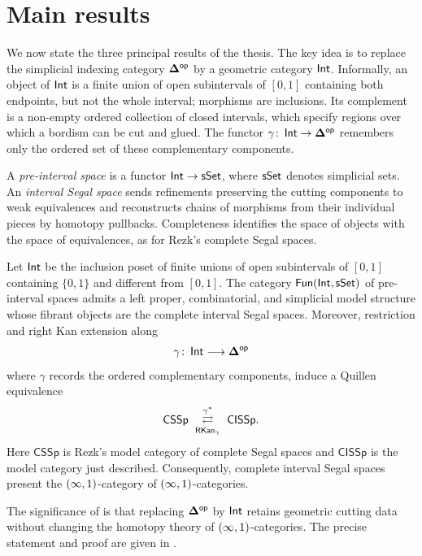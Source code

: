\section*{Main results}

We now state the three principal results of the thesis. The key idea is to
replace the simplicial indexing category $\mathbf\Delta^{\mathsf{op}}$ by a geometric
category $\operatorname{\mathsf{Int}}$. Informally, an object of $\operatorname{\mathsf{Int}}$ is a finite union of open
subintervals of $[0,1]$ containing both endpoints, but not the whole interval;
morphisms are inclusions. Its complement is a non-empty ordered collection
of closed intervals, which specify regions over which a bordism can be cut
and glued. The functor $\gamma\colon\operatorname{\mathsf{Int}}\to\mathbf\Delta^{\mathsf{op}}$ remembers only
the ordered set of these complementary components.

A \emph{pre-interval space} is a functor $\operatorname{\mathsf{Int}}\to\operatorname{\sf sSet}$, where $\operatorname{\sf sSet}$
denotes simplicial sets. An \emph{interval Segal space} sends refinements
preserving the cutting components to weak equivalences and reconstructs
chains of morphisms from their individual pieces by homotopy pullbacks.
Completeness identifies the space of objects with the space of equivalences,
as for Rezk's complete Segal spaces.

\begin{samepage}
\begin{maintheorem}
\label{intro:: thm: interval models}
Let $\operatorname{\mathsf{Int}}$ be the inclusion poset of finite unions of open subintervals of
$[0,1]$ containing $\{0,1\}$ and different from $[0,1]$. The category
$\operatorname{\sf Fun}(\operatorname{\mathsf{Int}},\operatorname{\sf sSet})$ of pre-interval spaces admits a left proper, combinatorial, and
simplicial model structure whose fibrant objects are the complete interval
Segal spaces. Moreover, restriction and right Kan extension along
\[
    \gamma\colon \operatorname{\mathsf{Int}}\longrightarrow\mathbf\Delta^{\mathsf{op}}
\]
where $\gamma$ records the ordered complementary components, induce a Quillen equivalence
\[
    \mathsf{CSSp}
    \ \underset{\operatorname{{\sf RKan}}_{\gamma}}{\overset{\gamma^{*}}{\rightleftarrows}}\
    \mathsf{CISSp}.
\]
Here $\mathsf{CSSp}$ is Rezk's model category of complete Segal spaces and
$\mathsf{CISSp}$ is the model category just described.
Consequently, complete interval Segal spaces present the
$(\operatorname{\infty},1)$-category of $(\operatorname{\infty},1)$-categories.
\end{maintheorem}
\end{samepage}

The significance of  is that replacing
$\mathbf\Delta^{\mathsf{op}}$ by $\operatorname{\mathsf{Int}}$ retains geometric cutting data without changing
the homotopy theory of $(\operatorname{\infty},1)$-categories. The precise statement and proof
are given in \Cref{ch2:: thm: complete interval model}.

